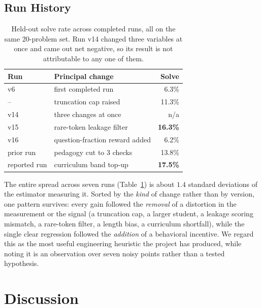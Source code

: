 \documentclass[conference]{IEEEtran}
\begin{document}
\subsection{Run History}

\begin{table}[t]
\caption{Held-out solve rate across completed runs, all on the same
20-problem set. Run v14 changed three variables at once and came out net
negative, so its result is not attributable to any one of them.}
\label{tab:history}
\centering
\small
\begin{tabular}{llr}
\toprule
\textbf{Run} & \textbf{Principal change} & \textbf{Solve} \\
\midrule
v6            & first completed run              & 6.3\% \\
--            & truncation cap raised            & 11.3\% \\
v14           & three changes at once            & n/a \\
v15           & rare-token leakage filter        & \textbf{16.3\%} \\
v16           & question-fraction reward added   & 6.2\% \\
prior run     & pedagogy cut to 3 checks         & 13.8\% \\
reported run  & curriculum band top-up           & \textbf{17.5\%} \\
\bottomrule
\end{tabular}
\end{table}

The entire spread across seven runs (Table~\ref{tab:history}) is about
$1.4$ standard deviations of the estimator measuring it. Sorted by the
\emph{kind} of change rather than by version, one pattern survives: every
gain followed the \emph{removal} of a distortion in the measurement or the
signal (a truncation cap, a larger student, a leakage scoring mismatch, a
rare-token filter, a length bias, a curriculum shortfall), while the single
clear regression followed the \emph{addition} of a behavioral incentive. We regard this as the most useful engineering heuristic the
project has produced, while noting it is an observation over seven noisy
points rather than a tested hypothesis.

\section{Discussion}
\end{document}
